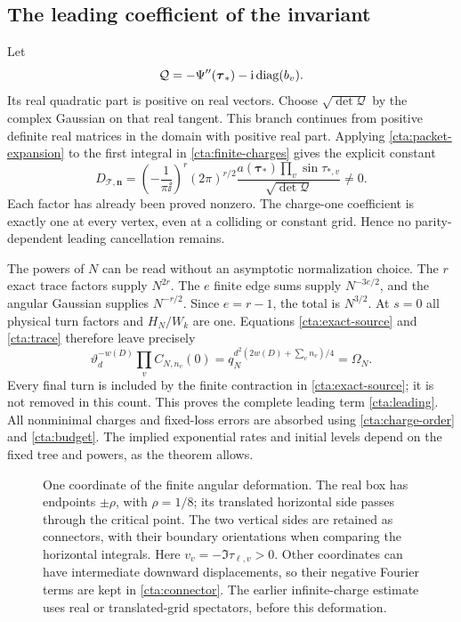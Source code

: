 \subsection{The leading coefficient of the invariant}\label{cta:conclusion}
Let
\[
 \mathcal Q=-\Psi''(\boldsymbol\tau_*)-\mathrm i\operatorname{diag}(b_v).
\]
Its real quadratic part is positive on real vectors.
Choose \(\sqrt{\det\mathcal Q}\) by the complex Gaussian on that
real tangent. This branch continues from positive definite real
matrices in the domain with positive real part.
Applying \eqref{cta:packet-expansion} to the first integral
in \eqref{cta:finite-charges} gives the explicit constant
\begin{equation}\label{cta:amplitude}
 D_{\mathcal T,\mathbf n}
 =\left(-\frac1{\pi\ii}\right)^r(2\pi)^{r/2}
   \frac{a(\boldsymbol\tau_*)\prod_v\sin\tau_{*,v}}
        {\sqrt{\det\mathcal Q}}\ne0 .
\end{equation}
Each factor has already been proved nonzero.
The charge-one coefficient is exactly one at every vertex,
even at a colliding or constant grid. Hence no parity-dependent
leading cancellation remains.

The powers of \(N\) can be read without an asymptotic
normalization choice. The \(r\) exact trace factors supply
\(N^{2r}\). The \(e\) finite edge sums supply \(N^{-3e/2}\),
and the angular Gaussian supplies \(N^{-r/2}\).
Since \(e=r-1\), the total is \(N^{3/2}\).
At \(s=0\) all physical turn factors and \(H_N/W_k\) are one.
Equations \eqref{cta:exact-source} and \eqref{cta:trace} therefore
leave precisely
\[
 \vartheta_d^{-w(D)}\prod_v C_{N,n_v}(0)
       =q_N^{d^2(2w(D)+\sum_vn_v)/4}=\Omega_N.
\]
Every final turn is included by the finite contraction in
\eqref{cta:exact-source}; it is not removed in this count.
This proves the complete leading term \eqref{cta:leading}.
All nonminimal charges and fixed-loss errors are absorbed
using \eqref{cta:charge-order} and \eqref{cta:budget}.
The implied exponential rates and initial levels depend on
the fixed tree and powers, as the theorem allows.

\begin{figure}[ht]
\centering
\caption{One coordinate of the finite angular deformation.
The real box has endpoints \(\pm\rho\), with \(\rho=1/8\);
its translated horizontal side passes through the critical point.
The two vertical sides are retained as connectors, with their
boundary orientations when comparing the horizontal integrals.
Here \(v_v=-\Im\tau_{\boldsymbol\ell,v}>0\).
Other coordinates can have intermediate downward displacements,
so their negative Fourier terms are kept in
\eqref{cta:connector}. The earlier infinite-charge estimate
uses real or translated-grid spectators, before this deformation.}
\label{cta:contour-figure}
\end{figure}

